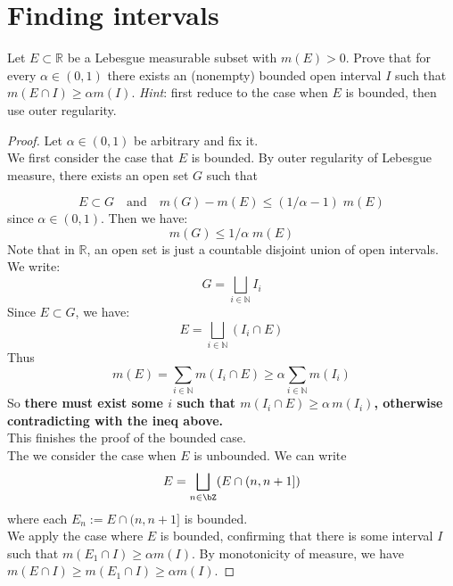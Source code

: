 \documentclass[lang=cn,11pt]{elegantbook}
\begin{document}
\section{Finding intervals}
  Let $E\subset\mathbb{R}$ be a Lebesgue measurable subset with $m(E)>0$. Prove that for every $\alpha\in(0,1)$ there exists an (nonempty) bounded open interval $I$ such that $m(E\cap I)\ge\alpha m(I)$.
  \textit{Hint}: first reduce to the case when $E$ is bounded, then use outer regularity.
\begin{proof}
Let $\alpha \in (0,1)$ be arbitrary and fix it.\\
We first consider the case that $E$ is bounded. By outer regularity of Lebesgue measure, there exists an open set \( G \) such that

\[
E \subset G \quad \text{and} \quad m(G) - m(E) \leq  (1/\alpha-1) \; m(E)
\]
since $\alpha \in (0,1)$.
Then we have:
$$
m(G) \leq  1 / \alpha \; m(E)
$$
Note that in $\mathbb{R}$, an open set is just a countable disjoint union of open intervals. We write:
$$
G = \bigsqcup_{i\in \mathbb{N}} I_i
$$
Since $E \subset G$, we have:
$$
E = \bigsqcup_{i\in \mathbb{N}}  (I_i \cap E)
$$
Thus 
$$
m(E) = \sum_{i\in \mathbb{N}}  m(I_i \cap E) \geq \alpha \sum_{i\in \mathbb{N}} m(I_i)
$$
So \textbf{there must exist some $i$ such that $m(I_i \cap E) \geq \alpha \, m(I_i)$, otherwise contradicting with the ineq above.}\\
This finishes the proof of the bounded case.\\
The we consider the case when $E$ is unbounded. 
We can write
\[
E = \bigsqcup_{n\in \bZ} (E \cap (n, n+1]) 
\]
where each $E_n :=E \cap (n, n+1]$ is bounded.\\
We apply the case where $E$ is bounded, confirming that there is some interval $I$ such that $m(E_1\cap I)\ge\alpha m(I)$. By monotonicity of measure, we have $m(E \cap I) \geq m(E_1 \cap I) \geq \alpha m(I)$.
\end{proof}
\end{document}
